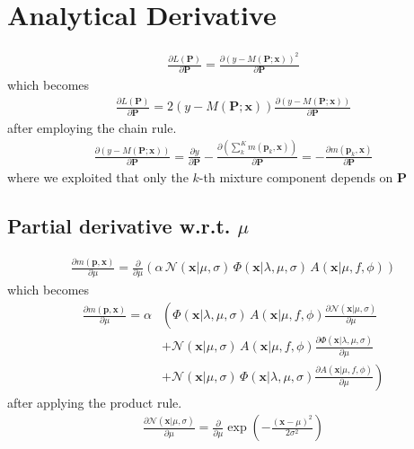 \documentclass{article}
\begin{document}
\section{Analytical Derivative}

\begin{align}
\frac{\partial L\left(\mathbf{P}\right)}{\partial \mathbf{P}}=\frac{\partial \left(y-M\left(\mathbf{P};\mathbf{x}\right)\right)^2}{\partial \mathbf{P}}
\end{align}
which becomes
\begin{align}
\frac{\partial L\left(\mathbf{P}\right)}{\partial \mathbf{P}}=2\left(y-M\left(\mathbf{P};\mathbf{x}\right)\right)\frac{\partial \left(y-M\left(\mathbf{P};\mathbf{x}\right)\right)}{\partial \mathbf{P}} \label{eq:chain_rule}
\end{align}
after employing the chain rule.
\begin{align}
\frac{\partial \left(y-M\left(\mathbf{P};\mathbf{x}\right)\right)}{\partial \mathbf{P}}= \frac{\partial y}{\partial \mathbf{P}} - \frac{\partial \left(\sum_k^K m\left(\mathbf{p}_k,\mathbf{x}\right)\right)}{\partial \mathbf{P}}= -\frac{\partial m\left(\mathbf{p}_k,\mathbf{x}\right)}{\partial \mathbf{P}}
\end{align}
where we exploited that only the $k$-th mixture component depends on $\mathbf{P}$

\subsection{Partial derivative w.r.t. $\mu$}
\begin{align}
\frac{\partial m\left(\mathbf{p},\mathbf{x}\right)}{\partial \mu} = \frac{\partial}{\partial \mu}\left(\alpha\,\mathcal{N}(\mathbf{x}|\mu,\sigma) \, \Phi(\mathbf{x}|\lambda,\mu,\sigma) \, A(\mathbf{x}|\mu,f,\phi)\right)
\end{align}
which becomes
\begin{align}
\frac{\partial m\left(\mathbf{p},\mathbf{x}\right)}{\partial \mu} = \alpha&\left(\Phi(\mathbf{x}|\lambda,\mu,\sigma) \, A(\mathbf{x}|\mu,f,\phi) \frac{\partial \mathcal{N}(\mathbf{x}|\mu,\sigma)}{\partial \mu} \right.
\\  & + \mathcal{N}(\mathbf{x}|\mu,\sigma) \, A(\mathbf{x}|\mu,f,\phi) \frac{\partial \Phi(\mathbf{x}|\lambda,\mu,\sigma)}{\partial \mu}
\\ & + \left. \mathcal{N}(\mathbf{x}|\mu,\sigma) \, \Phi(\mathbf{x}|\lambda,\mu,\sigma) \frac{\partial A(\mathbf{x}|\mu,f,\phi)}{\partial \mu} \right)
\end{align}
after applying the product rule.
\begin{align}
\frac{\partial \mathcal{N}(\mathbf{x}|\mu,\sigma)}{\partial \mu} = \frac{\partial}{\partial\mu} \exp\left(-\frac{\left(\mathbf{x}-\mu\right)^2}{2\sigma^2}\right) 
\end{align}
\end{document}
